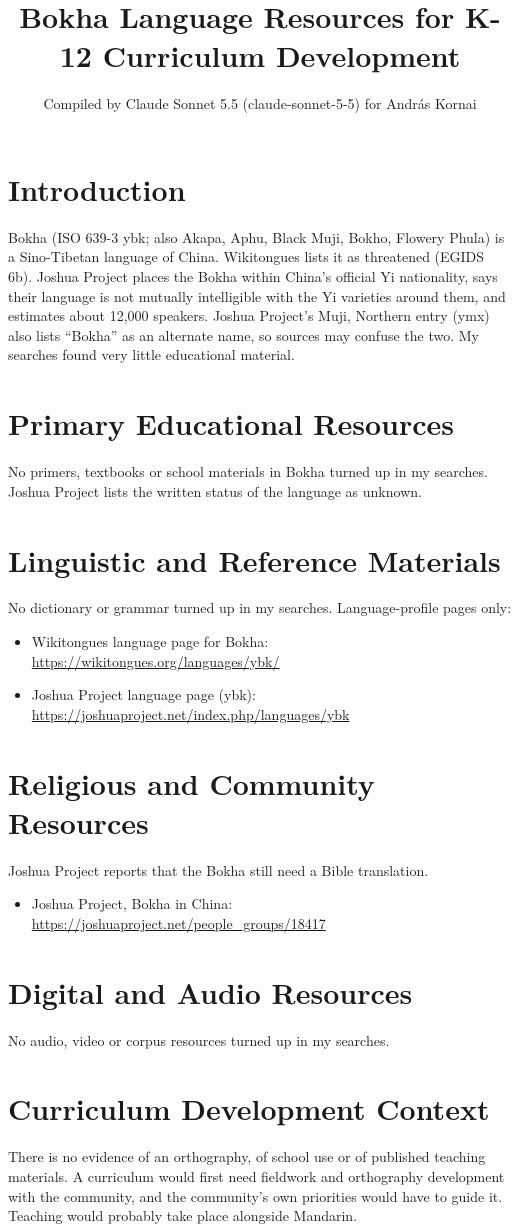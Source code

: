 \documentclass[12pt]{article}
\title{Bokha Language Resources for K-12 Curriculum Development}
\author{Compiled by Claude Sonnet 5.5 (claude-sonnet-5-5) for Andr\'as Kornai}
\date{}
\begin{document}
\maketitle

\section{Introduction}
Bokha (ISO 639-3 ybk; also Akapa, Aphu, Black Muji, Bokho, Flowery Phula) is a Sino-Tibetan language of China. Wikitongues lists it as threatened (EGIDS 6b). Joshua Project places the Bokha within China's official Yi nationality, says their language is not mutually intelligible with the Yi varieties around them, and estimates about 12{,}000 speakers. Joshua Project's Muji, Northern entry (ymx) also lists ``Bokha'' as an alternate name, so sources may confuse the two. My searches found very little educational material.

\section{Primary Educational Resources}
No primers, textbooks or school materials in Bokha turned up in my searches. Joshua Project lists the written status of the language as unknown.

\section{Linguistic and Reference Materials}
No dictionary or grammar turned up in my searches. Language-profile pages only:
\begin{itemize}
\item Wikitongues language page for Bokha: \url{https://wikitongues.org/languages/ybk/}
\item Joshua Project language page (ybk): \url{https://joshuaproject.net/index.php/languages/ybk}
\end{itemize}

\section{Religious and Community Resources}
Joshua Project reports that the Bokha still need a Bible translation.
\begin{itemize}
\item Joshua Project, Bokha in China: \url{https://joshuaproject.net/people_groups/18417}
\end{itemize}

\section{Digital and Audio Resources}
No audio, video or corpus resources turned up in my searches.

\section{Curriculum Development Context}
There is no evidence of an orthography, of school use or of published teaching materials. A curriculum would first need fieldwork and orthography development with the community, and the community's own priorities would have to guide it. Teaching would probably take place alongside Mandarin.
\end{document}
